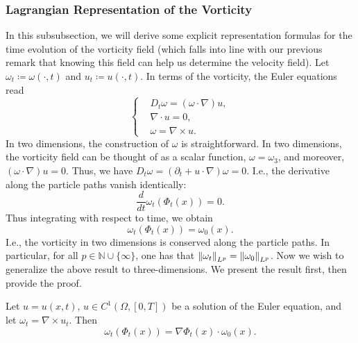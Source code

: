 \documentclass{article}
\begin{document}
\subsubsection{Lagrangian Representation of the Vorticity}
In this subsubsection, we will derive some explicit representation formulas for the time evolution of the vorticity field (which falls into line with our previous remark that knowing this field can help us determine the velocity field). Let $\omega_{t}\coloneqq \omega(\cdot,t)$ and $u_{t}\coloneqq u(\cdot,t)$. In terms of the vorticity, the Euler equations read 
\begin{equation}
	\left\{
	\begin{alignedat}{1}
		&D_{t}\omega = (\omega \cdot \nabla)u, \\
		&\nabla \cdot u = 0, \\
		&\omega = \nabla \times u. 
	\end{alignedat} 
	\right. 
	\label{eq:vorticity_formulation}
\end{equation} 
In two dimensions, the construction of $\omega$ is straightforward. In two dimensions, the vorticity field can be thought of as a scalar function, $\omega = \omega_{3}$, and moreover, $(\omega \cdot \nabla)u = 0$. Thus, we have $D_{t}\omega = (\partial_{t} + u \cdot \nabla)\omega = 0$. I.e., the derivative along the particle paths vanish identically: 
\begin{equation*}
	\frac{d}{dt}\omega_{t}(\Phi_{t}(x)) = 0. 
\end{equation*} 
Thus integrating with respect to time, we obtain 
\begin{equation}
	\omega_{t}(\Phi_{t}(x)) = \omega_{0}(x). 
\end{equation}
I.e., the vorticity in two dimensions is conserved along the particle paths. In particular, for all $p \in \mathbb{N}\cup \{\infty\}$, one has that $\left\Vert \omega_{t} \right\Vert_{L^{p}} = \left\Vert \omega_{0} \right\Vert_{L^{p}}$. Now we wish to generalize the above result to three-dimensions. We present the result first, then provide the proof. 
\begin{theorem}
	Let $u = u(x,t)$, $u \in C^{1}(\Omega,[0,T])$ be a solution of the Euler equation, and let $\omega_{t} = \nabla \times u_{t}$. Then 
	\begin{equation}
		\omega_{t}(\Phi_{t}(x)) = \nabla \Phi_{t}(x) \cdot \omega_{0}(x). 
	\end{equation}
\end{theorem} 
\end{document}
